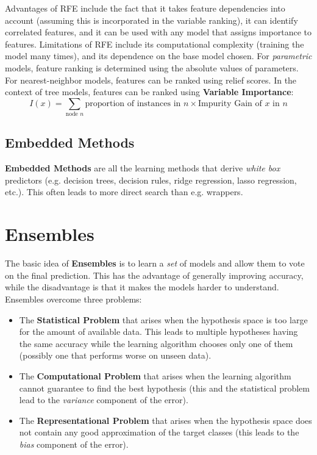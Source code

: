 \documentclass[12pt]{article}
\begin{document}
\noindent
Advantages of RFE include the fact that it takes feature dependencies into account (assuming this is incorporated in the variable ranking), it can identify correlated features, and it can be used with any model that assigns importance to features.
Limitations of RFE include its computational complexity (training the model many times), and its dependence on the base model chosen.
For \textit{parametric} models, feature ranking is determined using the absolute values of parameters.
For nearest-neighbor models, features can be ranked using relief scores.
In the context of tree models, features can be ranked using \textbf{Variable Importance}:
\[ I(x) = \sum_{\text{node } n} \text{proportion of instances in } n \times \text{Impurity Gain of } x \text{ in } n \]

\subsection{Embedded Methods}
\textbf{Embedded Methods} are all the learning methods that derive \textit{white box} predictors (e.g. decision trees, decision rules, ridge regression, lasso regression, etc.).
This often leads to more direct search than e.g. wrappers.

%
%
\newpage
\section{Ensembles}
The basic idea of \textbf{Ensembles} is to learn a \textit{set} of models and allow them to vote on the final prediction.
This has the advantage of generally improving accuracy, while the disadvantage is that it makes the models harder to understand.
Ensembles overcome three problems:

\begin{itemize}
    \item The \textbf{Statistical Problem} that arises when the hypothesis space is too large for the amount of available data. This leads to multiple hypotheses having the same accuracy while the learning algorithm chooses only one of them (possibly one that performs worse on unseen data).
    \item The \textbf{Computational Problem} that arises when the learning algorithm cannot guarantee to find the best hypothesis (this and the statistical problem lead to the \textit{variance} component of the error).
    \item The \textbf{Representational Problem} that arises when the hypothesis space does not contain any good approximation of the target classes (this leads to the \textit{bias} component of the error).
\end{itemize}
\end{document}
